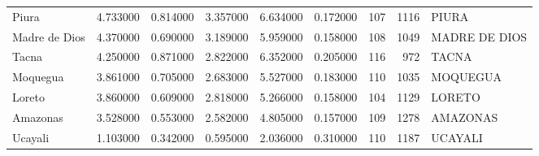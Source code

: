 \begin{table}[htbp]
\begin{tabular}{lrrrrrrrl}
Piura & 4.733000 & 0.814000 & 3.357000 & 6.634000 & 0.172000 & 107 & 1116 & PIURA \\
Madre de Dios & 4.370000 & 0.690000 & 3.189000 & 5.959000 & 0.158000 & 108 & 1049 & MADRE DE DIOS \\
Tacna & 4.250000 & 0.871000 & 2.822000 & 6.352000 & 0.205000 & 116 & 972 & TACNA \\
Moquegua & 3.861000 & 0.705000 & 2.683000 & 5.527000 & 0.183000 & 110 & 1035 & MOQUEGUA \\
Loreto & 3.860000 & 0.609000 & 2.818000 & 5.266000 & 0.158000 & 104 & 1129 & LORETO \\
Amazonas & 3.528000 & 0.553000 & 2.582000 & 4.805000 & 0.157000 & 109 & 1278 & AMAZONAS \\
Ucayali & 1.103000 & 0.342000 & 0.595000 & 2.036000 & 0.310000 & 110 & 1187 & UCAYALI \\
\bottomrule
\end{tabular}
\end{table}
